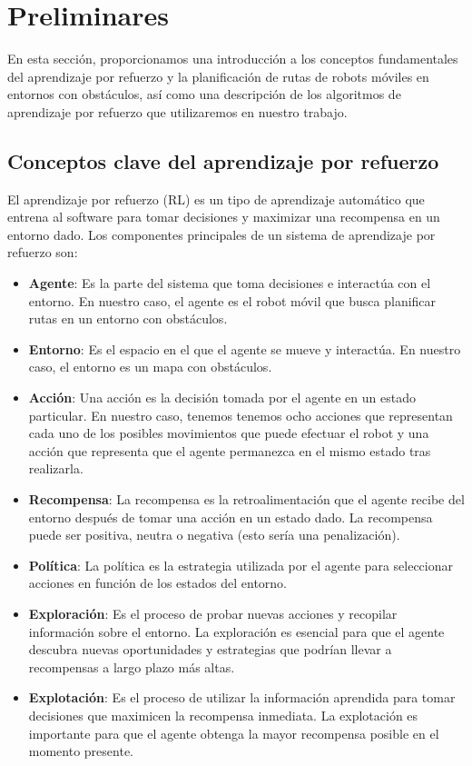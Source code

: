 \documentclass[conference,a4paper]{IEEEtran}
\begin{document}
\section{Preliminares}

En esta sección, proporcionamos una introducción a los conceptos fundamentales del aprendizaje por refuerzo y la planificación de rutas de robots 
móviles en entornos con obstáculos, así como una descripción de los algoritmos de aprendizaje por refuerzo que utilizaremos en nuestro trabajo.

\subsection{Conceptos clave del aprendizaje por refuerzo}

El aprendizaje por refuerzo (RL) es un tipo de aprendizaje automático que entrena al software para tomar decisiones y maximizar una recompensa en un entorno dado. 
Los componentes principales de un sistema de aprendizaje por refuerzo son:

\begin{itemize}
  \item \textbf{Agente}: Es la parte del sistema que toma decisiones e interactúa con el entorno. En nuestro caso, el agente es el robot móvil que busca planificar rutas en un entorno con obstáculos.
  \item \textbf{Entorno}: Es el espacio en el que el agente se mueve y interactúa. En nuestro caso, el entorno es un mapa con obstáculos.
  \item \textbf{Acción}: Una acción es la decisión tomada por el agente en un estado particular. En nuestro caso, tenemos tenemos ocho acciones que representan cada uno de los posibles movimientos que puede efectuar el robot y una 
    acción que representa que el agente permanezca en el mismo estado tras realizarla.
  \item \textbf{Recompensa}: La recompensa es la retroalimentación que el agente recibe del entorno después de tomar una acción en un estado dado. La recompensa puede ser positiva, neutra o negativa (esto sería una penalización).
  \item \textbf{Política}: La política es la estrategia utilizada por el agente para seleccionar acciones en función de los estados del entorno. 
  \item \textbf{Exploración}: Es el proceso de probar nuevas acciones y recopilar información sobre el entorno. La exploración es esencial para que el agente descubra nuevas oportunidades y estrategias que podrían llevar a recompensas a largo plazo más altas.
  \item \textbf{Explotación}: Es el proceso de utilizar la información aprendida para tomar decisiones que maximicen la recompensa inmediata. La explotación es importante para que el agente obtenga la mayor recompensa posible en el momento presente.
\end{itemize}
\end{document}
